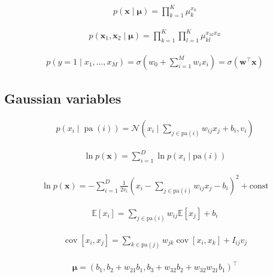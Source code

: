 \documentclass{article}
\begin{document}
\begin{align*}
p(\mathbf{x} \mid \boldsymbol{\mu})=\prod_{k=1}^{K} \mu_{k}^{x_{k}}
\tag{11.7}
\end{align*}

\begin{align*}
p\left(\mathbf{x}_{1}, \mathbf{x}_{2} \mid \boldsymbol{\mu}\right)=\prod_{k=1}^{K} \prod_{l=1}^{K} \mu_{k l}^{x_{1 k} x_{2 l}}
\tag{11.8}
\end{align*}

\begin{align*}
p\left(y=1 \mid x_{1}, \ldots, x_{M}\right)=\sigma\left(w_{0}+\sum_{i=1}^{M} w_{i} x_{i}\right)=\sigma\left(\mathbf{w}^{\top} \mathbf{x}\right)
\tag{11.9}
\end{align*}

\subsection{Gaussian variables}

\begin{align*}
p\left(x_{i} \mid \operatorname{pa}(i)\right)=\mathcal{N}\left(x_{i} \mid \sum_{j \in \mathrm{pa}(i)} w_{i j} x_{j}+b_{i}, v_{i}\right)
\tag{11.10}
\end{align*}

\begin{align*}
\ln p(\mathbf{x}) =\sum_{i=1}^{D} \ln p\left(x_{i} \mid \mathrm{pa}(i)\right)  
\tag{11.11}
\end{align*}

\begin{align*}
\ln p(\mathbf{x}) =-\sum_{i=1}^{D} \frac{1}{2 v_{i}}\left(x_{i}-\sum_{j \in \mathrm{pa}(i)} w_{i j} x_{j}-b_{i}\right)^{2}+\mathrm{const}
\tag{11.12}
\end{align*}

\begin{align*}
\mathbb{E}\left[
x_{i}\right]
=\sum_{j \in \mathrm{pa}(i)} w_{i j} \mathbb{E}\left[
x_{j}\right]
+b_{i} 
\tag{11.13}
\end{align*}

\begin{align*}
\operatorname{cov}\left[
x_{i}, x_{j}\right]
=\sum_{k \in \mathrm{pa}(j)} w_{j k} \operatorname{cov}\left[
x_{i}, x_{k}\right]
+I_{i j} v_{j}
\tag{11.14}
\end{align*}

\begin{align*}
\boldsymbol{\mu}=\left(b_{1}, b_{2}+w_{21} b_{1}, b_{3}+w_{32} b_{2}+w_{32} w_{21} b_{1}\right)^{\top} 
\tag{11.15}
\end{align*}
\end{document}
